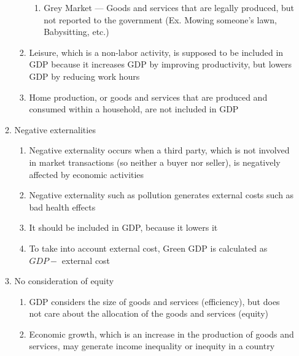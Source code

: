 \documentclass[12pt]{article}
\begin{document}
\begin{enumerate}
\begin{enumerate}
\begin{enumerate}
\begin{enumerate}
                  \item Grey Market — Goods and services that are legally produced, but not reported to the government (Ex. Mowing someone's lawn, Babysitting, etc.)

                \end{enumerate}

              \item Leisure, which is a non-labor activity, is supposed to be included in GDP because it increases GDP by improving productivity, but lowers GDP by reducing work hours

              \item Home production, or goods and services that are produced and consumed within a household, are not included in GDP

            \end{enumerate}

          \item Negative externalities

            \begin{enumerate}

              \item Negative externality occurs when a third party, which is not involved in market transactions (so neither a buyer nor seller), is negatively affected by economic activities

              \item Negative externality such as pollution generates external costs such as bad health effects

              \item It should be included in GDP, because it lowers it

              \item To take into account external cost, Green GDP is calculated as $GDP - $ external cost

            \end{enumerate}

          \item No consideration of equity

            \begin{enumerate}

              \item GDP considers the size of goods and services (efficiency), but does not care about the allocation of the goods and services (equity)

              \item Economic growth, which is an increase in the production of goods and services, may generate income inequality or inequity in a country


\end{enumerate}
\end{enumerate}
\end{enumerate}
\end{document}
